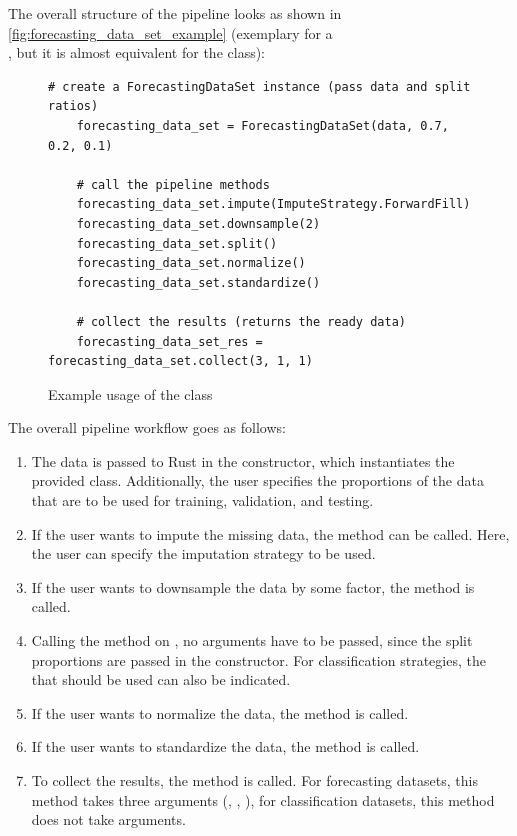 \documentclass[review]{AIM_report}
\begin{document}
The overall structure of the pipeline looks as shown in \autoref{fig:forecasting_data_set_example} (exemplary for a \\
\forecastingDataSet, but it is almost equivalent for the \classificationDataSet class):
\begin{figure}[H]
    \begin{lstlisting}[style=python]
    # create a ForecastingDataSet instance (pass data and split ratios)
    forecasting_data_set = ForecastingDataSet(data, 0.7, 0.2, 0.1)

    # call the pipeline methods
    forecasting_data_set.impute(ImputeStrategy.ForwardFill)
    forecasting_data_set.downsample(2)
    forecasting_data_set.split()
    forecasting_data_set.normalize()
    forecasting_data_set.standardize()

    # collect the results (returns the ready data)
    forecasting_data_set_res = forecasting_data_set.collect(3, 1, 1)
    \end{lstlisting}
    \caption{Example usage of the \forecastingDataSet class}
    \label{fig:forecasting_data_set_example}
\end{figure}

The overall pipeline workflow goes as follows:
\begin{enumerate}
    \item The data is passed to Rust in the constructor, which instantiates the provided class. Additionally, the user specifies the proportions of the data that are to be used for training, validation, and testing.
    \item If the user wants to impute the missing data, the \imputeStrategy method can be called. Here, the user can specify the imputation strategy to be used.
    \item If the user wants to downsample the data by some factor, the \downsample method is called.
    \item Calling the \splitShort method on \forecastingDataSet, no arguments have to be passed, since the split proportions are passed in the constructor. For classification strategies, the \splitStrategy that should be used can also be indicated.
    \item If the user wants to normalize the data, the \normalize method is called.
    \item If the user wants to standardize the data, the \standardize method is called.
    \item To collect the results, the \collect method is called. For forecasting datasets, this method takes three arguments (\pastWindow, \futureHorizon, \stride), for classification datasets, this method does not take arguments.
\end{enumerate}
\end{document}
